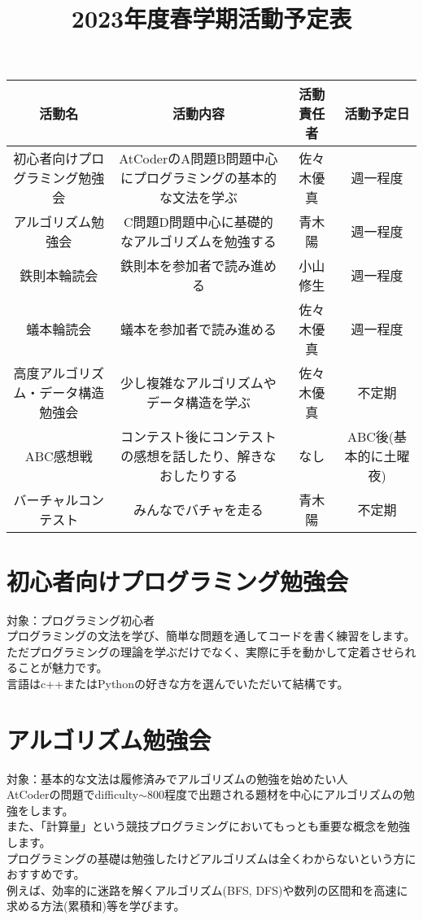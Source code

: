 \documentclass[a4paper, landscape]{jsarticle}
\title{2023年度春学期活動予定表}
\date{}
\begin{document}
\maketitle


\begin{table}[htbp]
  \centering
  \begin{tabular}{c|c|c|c}
    \hline
      活動名 & 活動内容 & 活動責任者 & 活動予定日 \\
    \hline \hline
      初心者向けプログラミング勉強会 & 
      AtCoderのA問題B問題中心にプログラミングの基本的な文法を学ぶ &
      佐々木優真  &
      週一程度 \\
    \hline
      アルゴリズム勉強会 &
      C問題D問題中心に基礎的なアルゴリズムを勉強する&
      青木陽 &
      週一程度 \\
    \hline
     鉄則本輪読会 &
     鉄則本を参加者で読み進める &
     小山修生 &
     週一程度 \\
    \hline
     蟻本輪読会 &
     蟻本を参加者で読み進める &
     佐々木優真 &
     週一程度 \\
    \hline \hline
     高度アルゴリズム・データ構造勉強会 &
     少し複雑なアルゴリズムやデータ構造を学ぶ &
     佐々木優真 &
     不定期 \\
    \hline
     ABC感想戦 &
     コンテスト後にコンテストの感想を話したり、解きなおしたりする &
     なし &
     ABC後(基本的に土曜夜)\\
   \hline
     バーチャルコンテスト &
     みんなでバチャを走る &
     青木陽 &
     不定期 \\
    \hline
  \end{tabular}
\end{table}

\section{初心者向けプログラミング勉強会}
\noindent
対象：プログラミング初心者\\
\indent
プログラミングの文法を学び、簡単な問題を通してコードを書く練習をします。\\
ただプログラミングの理論を学ぶだけでなく、実際に手を動かして定着させられることが魅力です。\\
言語はc++またはPythonの好きな方を選んでいただいて結構です。

\section{アルゴリズム勉強会} \label{sec:algo}
\noindent
対象：基本的な文法は履修済みでアルゴリズムの勉強を始めたい人\\
\indent
AtCoderの問題でdifficulty$\sim$800程度で出題される題材を中心にアルゴリズムの勉強をします。\\
また、「計算量」という競技プログラミングにおいてもっとも重要な概念を勉強します。\\
プログラミングの基礎は勉強したけどアルゴリズムは全くわからないという方におすすめです。\\
例えば、効率的に迷路を解くアルゴリズム(BFS, DFS)や数列の区間和を高速に求める方法(累積和)等を学びます。
\end{document}
